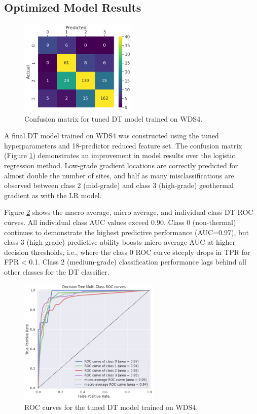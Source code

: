 \subsection{Optimized Model Results}\label{dtree_final_results}
\begin{figure}[!htp]
\centering
\includegraphics[width=0.5\textwidth]{templates/images/Figure-DT-ConfusionMatrix.png}
\singlespacing
\caption[Decision tree confusion matrix]{Confusion matrix for tuned DT model trained on WDS4.}
\label{fig:dtree_conf_matrix}
\end{figure}

A final DT model trained on WDS4 was constructed using the tuned hyperparameters and 18-predictor reduced feature set. The confusion matrix (Figure \ref{fig:dtree_conf_matrix}) demonstrates an improvement in model results over the logistic regression method. Low-grade gradient locations are correctly predicted for almost double the number of sites, and half as many misclassifications are observed between class 2 (mid-grade) and class 3 (high-grade) geothermal gradient as with the LR model.

Figure \ref{fig:dtree_auc} shows the macro average, micro average, and individual class DT ROC curves. All individual class AUC values exceed 0.90. Class 0 (non-thermal) continues to demonstrate the highest predictive performance (AUC=0.97), but class 3 (high-grade) predictive ability boosts micro-average AUC at higher decision thresholds, i.e., where the class 0 ROC curve steeply drops in TPR for FPR < 0.1. Class 2 (medium-grade) classification performance lags behind all other classes for the DT classifier.

\begin{figure}[!htp]
\centering
\includegraphics[width=0.6\textwidth]{templates/images/Figure-DT_AUC.png}
\caption[Decision tree ROC curves]{ROC curves for the tuned DT model trained on WDS4.}
\label{fig:dtree_auc}
\end{figure}

